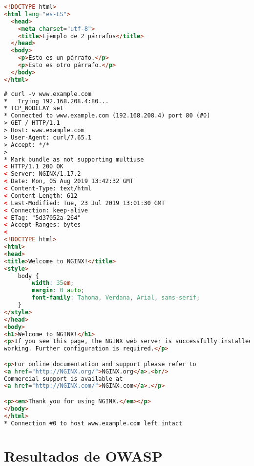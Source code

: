 \begin{lstlisting}[language=html, label={lst:simple_html_web},caption={Web sencilla realizada en HTML puro}]
<!DOCTYPE html>
<html lang="es-ES">
  <head>
    <meta charset="utf-8">
    <title>Ejemplo de 2 párrafos</title>
  </head>
  <body>
    <p>Esto es un párrafo.</p>
    <p>Esto es otro párrafo.</p>
  </body>
</html>
\end{lstlisting}

\begin{lstlisting}[language=html, label={lst:nginx_welcome_message},caption={Mensaje de bienvenida de NGINX}]
# curl -v www.example.com
*   Trying 192.168.208.4:80...
* TCP_NODELAY set
* Connected to www.example.com (192.168.208.4) port 80 (#0)
> GET / HTTP/1.1
> Host: www.example.com
> User-Agent: curl/7.65.1
> Accept: */*
>
* Mark bundle as not supporting multiuse
< HTTP/1.1 200 OK
< Server: NGINX/1.17.2
< Date: Mon, 05 Aug 2019 13:42:32 GMT
< Content-Type: text/html
< Content-Length: 612
< Last-Modified: Tue, 23 Jul 2019 13:01:30 GMT
< Connection: keep-alive
< ETag: "5d37052a-264"
< Accept-Ranges: bytes
<
<!DOCTYPE html>
<html>
<head>
<title>Welcome to NGINX!</title>
<style>
    body {
        width: 35em;
        margin: 0 auto;
        font-family: Tahoma, Verdana, Arial, sans-serif;
    }
</style>
</head>
<body>
<h1>Welcome to NGINX!</h1>
<p>If you see this page, the NGINX web server is successfully installed and
working. Further configuration is required.</p>

<p>For online documentation and support please refer to
<a href="http://NGINX.org/">NGINX.org</a>.<br/>
Commercial support is available at
<a href="http://NGINX.com/">NGINX.com</a>.</p>

<p><em>Thank you for using NGINX.</em></p>
</body>
</html>
* Connection #0 to host www.example.com left intact
\end{lstlisting}

\section{Resultados de OWASP}

